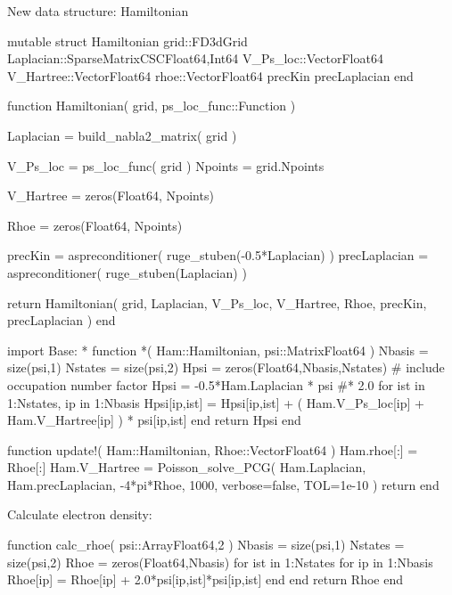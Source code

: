 New data structure: Hamiltonian

\begin{juliacode}
mutable struct Hamiltonian
  grid::FD3dGrid
  Laplacian::SparseMatrixCSC{Float64,Int64}
  V_Ps_loc::Vector{Float64}
  V_Hartree::Vector{Float64}
  rhoe::Vector{Float64}
  precKin
  precLaplacian
end
\end{juliacode}

\begin{juliacode}
function Hamiltonian( grid, ps_loc_func::Function )
    
  Laplacian = build_nabla2_matrix( grid )
    
  V_Ps_loc = ps_loc_func( grid )
  Npoints = grid.Npoints
    
  V_Hartree = zeros(Float64, Npoints)

  Rhoe = zeros(Float64, Npoints)

  precKin = aspreconditioner( ruge_stuben(-0.5*Laplacian) )
  precLaplacian = aspreconditioner( ruge_stuben(Laplacian) )
    
  return Hamiltonian( grid, Laplacian, V_Ps_loc, V_Hartree, Rhoe, precKin, precLaplacian )
end
\end{juliacode}


\begin{juliacode}
import Base: *
function *( Ham::Hamiltonian, psi::Matrix{Float64} )
  Nbasis = size(psi,1)
  Nstates = size(psi,2)
  Hpsi = zeros(Float64,Nbasis,Nstates)
  # include occupation number factor
  Hpsi = -0.5*Ham.Laplacian * psi #* 2.0
  for ist in 1:Nstates, ip in 1:Nbasis
    Hpsi[ip,ist] = Hpsi[ip,ist] + ( Ham.V_Ps_loc[ip] + Ham.V_Hartree[ip] ) * psi[ip,ist]
  end
  return Hpsi
end
\end{juliacode}

\begin{juliacode}
function update!( Ham::Hamiltonian, Rhoe::Vector{Float64} )
  Ham.rhoe[:] = Rhoe[:]
  Ham.V_Hartree = Poisson_solve_PCG(
      Ham.Laplacian, Ham.precLaplacian, -4*pi*Rhoe, 1000,
      verbose=false, TOL=1e-10
  )
  return
end
\end{juliacode}

Calculate electron density:
\begin{juliacode}
function calc_rhoe( psi::Array{Float64,2} )
  Nbasis = size(psi,1)
  Nstates = size(psi,2)
  Rhoe = zeros(Float64,Nbasis)
  for ist in 1:Nstates
    for ip in 1:Nbasis
      Rhoe[ip] = Rhoe[ip] + 2.0*psi[ip,ist]*psi[ip,ist]
    end
  end
  return Rhoe
end
\end{juliacode}


